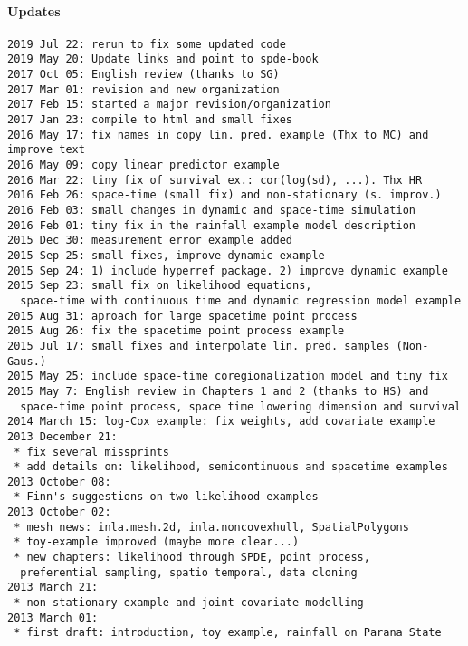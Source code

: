 \paragraph{Updates}

\begin{verbatim}
2019 Jul 22: rerun to fix some updated code
2019 May 20: Update links and point to spde-book
2017 Oct 05: English review (thanks to SG)
2017 Mar 01: revision and new organization
2017 Feb 15: started a major revision/organization
2017 Jan 23: compile to html and small fixes
2016 May 17: fix names in copy lin. pred. example (Thx to MC) and improve text
2016 May 09: copy linear predictor example
2016 Mar 22: tiny fix of survival ex.: cor(log(sd), ...). Thx HR
2016 Feb 26: space-time (small fix) and non-stationary (s. improv.)
2016 Feb 03: small changes in dynamic and space-time simulation
2016 Feb 01: tiny fix in the rainfall example model description
2015 Dec 30: measurement error example added 
2015 Sep 25: small fixes, improve dynamic example
2015 Sep 24: 1) include hyperref package. 2) improve dynamic example
2015 Sep 23: small fix on likelihood equations, 
  space-time with continuous time and dynamic regression model example
2015 Aug 31: aproach for large spacetime point process 
2015 Aug 26: fix the spacetime point process example  
2015 Jul 17: small fixes and interpolate lin. pred. samples (Non-Gaus.)
2015 May 25: include space-time coregionalization model and tiny fix
2015 May 7: English review in Chapters 1 and 2 (thanks to HS) and 
  space-time point process, space time lowering dimension and survival
2014 March 15: log-Cox example: fix weights, add covariate example
2013 December 21: 
 * fix several missprints
 * add details on: likelihood, semicontinuous and spacetime examples 
2013 October 08: 
 * Finn's suggestions on two likelihood examples 
2013 October 02:
 * mesh news: inla.mesh.2d, inla.noncovexhull, SpatialPolygons 
 * toy-example improved (maybe more clear...) 
 * new chapters: likelihood through SPDE, point process, 
  preferential sampling, spatio temporal, data cloning
2013 March 21:
 * non-stationary example and joint covariate modelling
2013 March 01: 
 * first draft: introduction, toy example, rainfall on Parana State
\end{verbatim}
